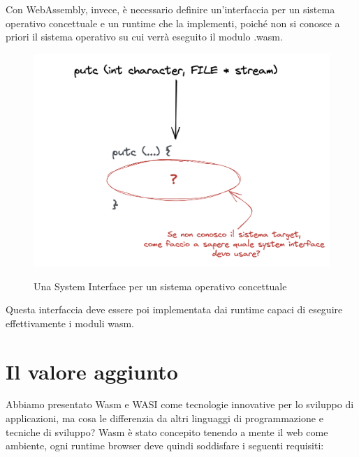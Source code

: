 Con WebAssembly, invece, è necessario definire un'interfaccia per un sistema operativo concettuale e un runtime che la
implementi, poiché non si conosce a priori il sistema operativo su cui verrà eseguito il modulo .wasm.
\begin{figure}[H]
    \centering
    \captionsetup{justification=centering}
    \includegraphics[width=15cm]{./images/5a.wasi_sys_interface.png}
    \label{system-interface-conceptual-sys}
    \caption{Una System Interface per un sistema operativo concettuale}
\end{figure}
Questa interfaccia deve essere poi implementata dai runtime capaci di eseguire effettivamente i moduli wasm.

\section{Il valore aggiunto}
Abbiamo presentato Wasm e WASI come tecnologie innovative per lo sviluppo di applicazioni, ma cosa le differenzia da
altri linguaggi di programmazione e tecniche di sviluppo? Wasm è stato concepito tenendo a mente il web come ambiente,
ogni runtime browser deve quindi soddisfare i seguenti requisiti:

